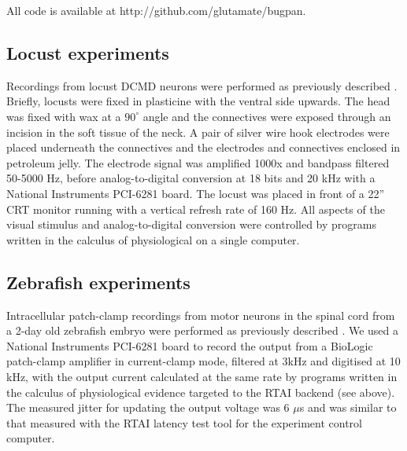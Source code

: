 All code is available at http://github.com/glutamate/bugpan.

\subsection*{Locust experiments}

Recordings from locust DCMD neurons were performed as previously
described \citep{Matheson2004}. Briefly, locusts were fixed in
plasticine with the ventral side upwards. The head was fixed with wax
at a $90^{\circ}$ angle and the connectives were exposed through an
incision in the soft tissue of the neck. A pair of silver wire hook
electrodes were placed underneath the connectives and the electrodes
and connectives enclosed in petroleum jelly. The electrode signal was
amplified 1000x and bandpass filtered 50-5000 Hz, before
analog-to-digital conversion at 18 bits and 20 kHz with a National
Instruments PCI-6281 board. The locust was placed in front of a 22''
CRT monitor running with a vertical refresh rate of 160 Hz. All
aspects of the visual stimulus and analog-to-digital conversion were
controlled by programs written in the calculus of physiological on a
single computer.

\subsection*{Zebrafish experiments}

Intracellular patch-clamp recordings from motor neurons in the spinal
cord from a 2-day old zebrafish embryo were performed as previously
described \citep{McDearmid2006}. We used a National Instruments PCI-6281 board to
record the output from a BioLogic patch-clamp amplifier in
current-clamp mode, filtered at 3kHz and digitised at 10 kHz, with the
output current calculated at the same rate by programs written in the
calculus of physiological evidence targeted to the RTAI backend (see
above). The measured jitter for updating the output voltage was 6
$\mu$s and was similar to that measured with the RTAI latency test
tool for the experiment control computer.





